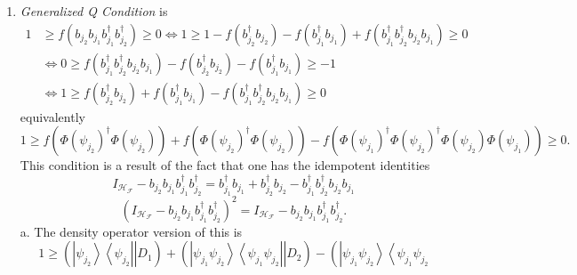 \documentclass[aps,preprint]{revtex4}%
\begin{document}
\begin{enumerate}
\item \emph{Generalized Q Condition }is%
\begin{align}
1  &  \geq f\left(  b_{j_{2}}b_{j_{1}}b_{j_{1}}^{\dagger}b_{j_{2}}^{\dagger
}\right)  \geq0\Leftrightarrow1\geq1-f\left(  b_{j_{2}}^{\dagger}b_{j_{2}%
}\right)  -f\left(  b_{j_{1}}^{\dagger}b_{j_{1}}\right)  +f\left(  b_{j_{1}%
}^{\dagger}b_{j_{2}}^{\dagger}b_{j_{2}}b_{j_{1}}\right)  \geq0\nonumber\\
&  \Leftrightarrow0\geq f\left(  b_{j_{1}}^{\dagger}b_{j_{2}}^{\dagger
}b_{j_{2}}b_{j_{1}}\right)  -f\left(  b_{j_{2}}^{\dagger}b_{j_{2}}\right)
-f\left(  b_{j_{1}}^{\dagger}b_{j_{1}}\right)  \geq-1\nonumber\\
&  \Leftrightarrow1\geq f\left(  b_{j_{2}}^{\dagger}b_{j_{2}}\right)
+f\left(  b_{j_{1}}^{\dagger}b_{j_{1}}\right)  -f\left(  b_{j_{1}}^{\dagger
}b_{j_{2}}^{\dagger}b_{j_{2}}b_{j_{1}}\right)  \geq0
\end{align}
equivalently
\begin{equation}
1\geq f\left(  \Phi\left(  \psi_{j_{2}}\right)  ^{\dagger}\Phi\left(
\psi_{j_{2}}\right)  \right)  +f\left(  \Phi\left(  \psi_{j_{2}}\right)
^{\dagger}\Phi\left(  \psi_{j_{2}}\right)  \right)  -f\left(  \Phi\left(
\psi_{j_{1}}\right)  ^{\dagger}\Phi\left(  \psi_{j_{2}}\right)  ^{\dagger}%
\Phi\left(  \psi_{j_{2}}\right)  \Phi\left(  \psi_{j_{1}}\right)  \right)
\geq0.
\end{equation}
This condition is a result of the fact that one has the idempotent identities
\begin{equation}
I_{\mathcal{H}_{\mathcal{F}}}-b_{j_{2}}b_{j_{1}}b_{j_{1}}^{\dagger}b_{j_{2}%
}^{\dagger}=b_{j_{1}}^{\dagger}b_{j_{1}}+b_{j_{2}}^{\dagger}b_{j_{2}}%
-b_{j_{1}}^{\dagger}b_{j_{2}}^{\dagger}b_{j_{2}}b_{j_{1}}%
\end{equation}%
\begin{equation}
\left(  I_{\mathcal{H}_{\mathcal{F}}}-b_{j_{2}}b_{j_{1}}b_{j_{1}}^{\dagger
}b_{j_{2}}^{\dagger}\right)  ^{2}=I_{\mathcal{H}_{\mathcal{F}}}-b_{j_{2}%
}b_{j_{1}}b_{j_{1}}^{\dagger}b_{j_{2}}^{\dagger}.
\end{equation}
a. The density operator version of this is
\begin{equation}
1\geq\left(  \left.  \left\vert \psi_{j_{2}}\right\rangle \left\langle
\psi_{j_{2}}\right\vert \right\vert D_{1}\right)  +\left(  \left.  \left\vert
\psi_{j_{1}}\psi_{j_{2}}\right\rangle \left\langle \psi_{j_{1}}\psi_{j_{2}%
}\right\vert \right\vert D_{2}\right)  -\left(  \left.  \left\vert \psi
_{j_{1}}\psi_{j_{2}}\right\rangle \left\langle \psi_{j_{1}}\psi_{j_{2}%
}
\end{equation}
\end{enumerate}
\end{document}
